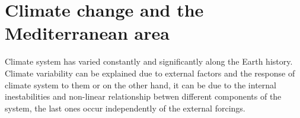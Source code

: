 \section{Climate change and the Mediterranean area}



Climate system has varied constantly and significantly along the Earth history. Climate variability can be explained due to external factors and the response of climate system to them or on the other hand, it can be due to the internal inestabilities and non-linear relationship betwen different components of the system, the last ones occur independently of the external forcings.


